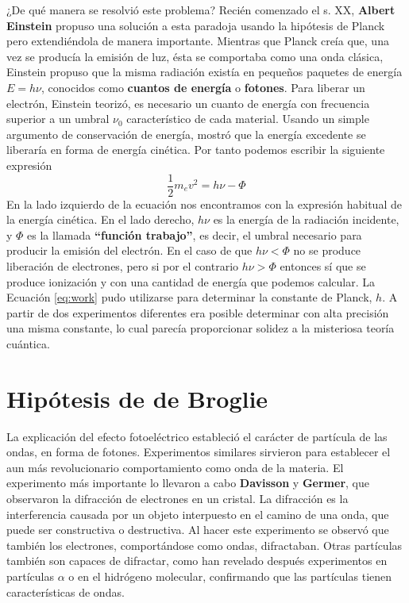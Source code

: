 \documentclass{tufte-handout}
\begin{document}
¿De qué manera se resolvió este problema? Recién 
comenzado el s. XX, 
\textbf{Albert Einstein} propuso una solución a esta paradoja
usando la hipótesis de Planck pero extendiéndola de manera
importante.
Mientras que Planck creía que, una vez se producía la emisión
de luz, ésta se comportaba como una onda clásica, Einstein
propuso que la misma radiación existía en pequeños
paquetes de energía $E=h\nu$, conocidos como 
\textbf{cuantos de energía} o 
\textbf{fotones}.
Para liberar un electrón, Einstein teorizó, es
necesario un cuanto de energía con frecuencia
superior a un umbral 
$\nu_0$ característico de cada material. 
Usando un simple argumento de conservación de energía,
mostró que la energía excedente se liberaría en forma de energía 
cinética. Por tanto
podemos escribir la siguiente expresión
\begin{equation}
\frac{1}{2}m_ev^2=h\nu - \Phi \label{eq:work}
\end{equation}
En la lado izquierdo de la ecuación nos encontramos con la 
expresión habitual de la energía cinética. En el lado
derecho, $h\nu$ es la energía de la radiación incidente, y 
$\Phi$ es la llamada \textbf{``función trabajo''}, es decir, el umbral necesario para 
producir la emisión del electrón. En el caso de que
$h\nu<\Phi$ no se produce liberación de electrones, pero si
por el contrario $h\nu>\Phi$ entonces sí que se produce
ionización y con una cantidad de energía que podemos calcular.
La Ecuación \ref{eq:work} pudo utilizarse para determinar 
la constante de Planck, $h$.  A partir de dos experimentos diferentes
era posible determinar con alta precisión una misma constante,
lo cual parecía proporcionar solidez a la misteriosa teoría
cuántica.

\section{Hipótesis de de Broglie}
La explicación del efecto fotoeléctrico estableció el carácter de
partícula de las ondas, en forma de fotones. 
Experimentos similares sirvieron para 
establecer el aun más revolucionario comportamiento como onda 
de la materia. El experimento más importante lo llevaron a cabo 
\textbf{Davisson} y \textbf{Germer}, 
que observaron la difracción de electrones en un cristal. 
La difracción es la interferencia causada por un objeto 
interpuesto en el camino de una onda, que puede ser constructiva
o destructiva. Al hacer este experimento se observó que también 
los electrones, comportándose como ondas, difractaban.
Otras partículas también son capaces de difractar, como han 
revelado después experimentos en partículas $\alpha$ o en
el hidrógeno molecular, confirmando que las partículas tienen
características de ondas. 
\end{document}
